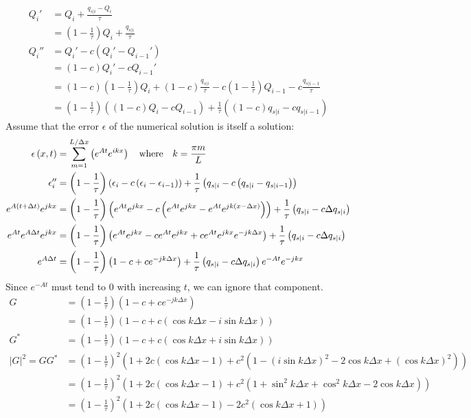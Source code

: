 \documentclass[12pt]{article}
\begin{document}
\begin{align*}
Q_i' &= Q_i + \frac{q_{s|i} - Q_i}{\tau} \\
&= \left(1 - \frac{1}{\tau}\right)Q_i + \frac{q_{s|i}}{\tau} \\
Q_i'' &= Q_i' - c\left(Q_i' - Q_{i-1}'\right) \\
&= \left(1-c\right)Q_i' - cQ_{i-1}' \\
&= \left(1-c\right)\left(1 - \frac{1}{\tau}\right)Q_i + \left(1-c\right)\frac{q_{s|i}}{\tau}
	-c\left(1 - \frac{1}{\tau}\right)Q_{i-1} -c\frac{q_{s|i-1}}{\tau} \\
&= \left(1-\frac{1}{\tau}\right)\left((1-c)Q_i -cQ_{i-1}\right)
	+\frac{1}{\tau}\left((1-c)q_{s|i}-cq_{s|i-1}\right)
\end{align*}
Assume that the error $\epsilon$ of the numerical solution is itself a solution:
\begin{align*}
\epsilon\left(x,t\right)&=\sum_{m=1}^{L/\Delta x}\left(e^{At}e^{ikx}\right)
	\text{\quad where\quad} k=\frac{\pi m}{L} \\
\epsilon_i'' &= \left(1-\frac{1}{\tau}\right)\left(\epsilon_i -c\left(\epsilon_i-\epsilon_{i-1}\right)\right)
	+\frac{1}{\tau}\left(q_{s|i}-c\left(q_{s|i}-q_{s|i-1}\right)\right) \\
e^{A\left(t+\Delta t\right)}e^{jkx}
	&= \left(1-\frac{1}{\tau}\right)\left(e^{At}e^{jkx}
			-c\left(e^{At}e^{jkx}-e^{At}e^{jk\left(x-\Delta x\right)}\right)\right)
		+\frac{1}{\tau}\left(q_{s|i}-c\Delta q_{s|i}\right) \\
e^{At}e^{A\Delta t}e^{jkx}
	&= \left(1-\frac{1}{\tau}\right)\left(e^{At}e^{jkx}
			-ce^{At}e^{jkx}+ce^{At}e^{jkx}e^{-jk\Delta x}\right)
		+\frac{1}{\tau}\left(q_{s|i}-c\Delta q_{s|i}\right) \\
e^{A\Delta t} &= \left(1-\frac{1}{\tau}\right)\left(1-c+ce^{-jk\Delta x}\right)
		+\frac{1}{\tau}\left(q_{s|i}-c\Delta q_{s|i}\right)e^{-At}e^{-jkx}
\end{align*}
Since $e^{-At}$ must tend to $0$ with increasing $t$, we can ignore that component.
\begin{align*}
G &= \left(1-\frac{1}{\tau}\right)\left(1-c+ce^{-jk\Delta x}\right) \\
&= \left(1-\frac{1}{\tau}\right)\left(1-c+c\left(\cos{k\Delta x}-i\sin{k\Delta x}\right)\right) \\
G^* &= \left(1-\frac{1}{\tau}\right)\left(1-c+c\left(\cos{k\Delta x}+i\sin{k\Delta x}\right)\right) \\
|G|^2=GG^*&=\left(1-\frac{1}{\tau}\right)^2\left(1
		+2c\left(\cos{k\Delta x}-1\right)
		+c^2\left(1-\left(i\sin{k\Delta x}\right)^2
		-2\cos{k\Delta x}+\left(\cos{k\Delta x}\right)^2\right)\right) \\
&=\left(1-\frac{1}{\tau}\right)^2\left(1
		+2c\left(\cos{k\Delta x}-1\right)
		+c^2\left(1+\sin^2{k\Delta x}+\cos^2{k\Delta x}
		-2\cos{k\Delta x}\right)\right) \\
&=\left(1-\frac{1}{\tau}\right)^2\left(1
		+2c\left(\cos{k\Delta x}-1\right)
		-2c^2\left(\cos{k\Delta x}+1\right)\right)
\end{align*}
\end{document}

